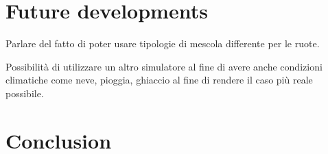 \documentclass[a4paper,final,12pt]{report}
\begin{document}
\chapter{Future developments}
Parlare del fatto di poter usare tipologie di mescola differente per le ruote.

Possibilità di utilizzare un altro simulatore al fine di avere anche condizioni climatiche come neve, pioggia, ghiaccio al fine di rendere il caso più reale possibile.

\chapter{Conclusion}



































\end{document}
